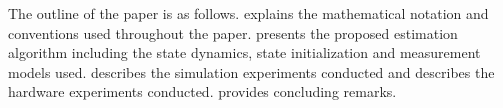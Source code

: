 
The outline of the paper is as follows.
 explains the mathematical notation and conventions used throughout the paper.
 presents the proposed estimation algorithm including the
state dynamics, state initialization and measurement models used.
 describes the simulation experiments conducted and
 describes the hardware experiments conducted.
 provides concluding remarks.
